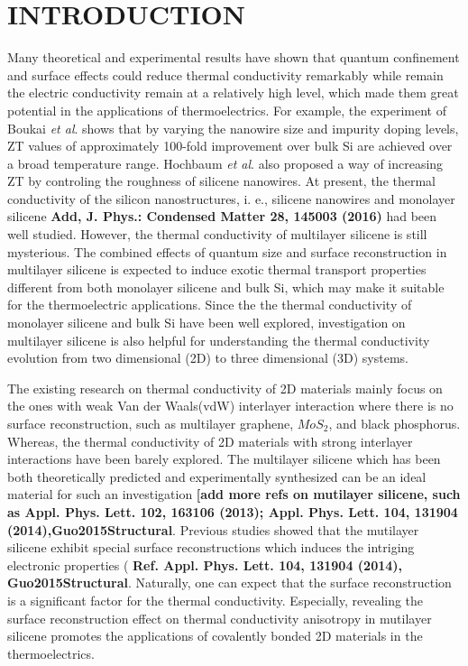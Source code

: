 \documentclass[aps,prb,twocolumn,showpacs,amsmath,amssymb]{revtex4-1}
\begin{document}
\maketitle

\section{INTRODUCTION}

Many theoretical and experimental results have shown that quantum confinement and surface effects could reduce thermal conductivity remarkably while remain the electric conductivity remain at a relatively high level, which made them great potential in the applications of thermoelectrics. For example, the experiment of Boukai \emph{et al}.\cite{Boukai2008} shows that by varying the nanowire size and impurity doping levels, ZT values of approximately 100-fold improvement over bulk Si are achieved over a broad temperature range. Hochbaum \emph{et al}.\cite{Hochbaum2008} also proposed a way of increasing ZT by controling the roughness of silicene nanowires. At present, the thermal conductivity of the silicon nanostructures, i. e.,  silicene nanowires\cite{Hochbaum2008,Yang2010,Shi2009,Boukai2008} and monolayer silicene\cite{Pei2013,Ng2013,Xie2014,Zhang2014,Liu2014,Wang2015,Zhang2015a} \textbf{Add, J. Phys.: Condensed Matter 28, 145003 (2016)} had been well studied. However, the thermal conductivity of multilayer silicene is still mysterious.  
The combined effects of quantum size and surface reconstruction in multilayer silicene is expected to induce exotic thermal transport properties different from both monolayer silicene and bulk Si,  which may make it suitable for the thermoelectric applications. Since the the thermal conductivity of monolayer silicene and  bulk Si have been well explored, investigation on multilayer silicene is also helpful for understanding the thermal conductivity  evolution from two dimensional (2D) to three dimensional (3D) systems.

The existing research on thermal conductivity of  2D materials  mainly focus on the ones with weak Van der Waals(vdW) interlayer interaction where there is no surface reconstruction, such as multilayer graphene\cite{Lindsay2011,Ni2012,Wang2011}, $MoS_2$\cite{Liu2015}, and black phosphorus\cite{Zhang2015,Peng2015,Jain2015}.  Whereas, the thermal conductivity of 2D materials with strong interlayer interactions have been barely explored.
The multilayer silicene which has been both theoretically predicted and experimentally synthesized can be an ideal material for such an investigation\cite{}\textbf{ [add more refs on mutilayer silicene, such as Appl. Phys. Lett. 102, 163106 (2013); Appl. Phys. Lett. 104, 131904 (2014),Guo2015Structural}. 
Previous studies  showed that the mutilayer silicene exhibit special surface reconstructions which induces the intriging electronic properties ( \textbf{ Ref. Appl. Phys. Lett. 104, 131904 (2014), Guo2015Structural}. Naturally, one can expect that  the surface reconstruction is a significant factor for the thermal conductivity. 
Especially, revealing the surface reconstruction effect on thermal conductivity anisotropy  in mutilayer silicene  promotes the applications of covalently bonded 2D materials in the thermoelectrics.
\end{document}
